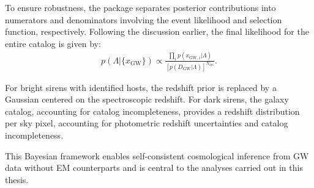 To ensure robustness, the package separates posterior contributions into numerators and denominators involving the event likelihood and selection function, respectively. Following the discussion earlier, the final likelihood for the entire catalog is given by:
\begin{align}
    p(\Lambda | \{x_\mathrm{GW}\}) \propto \frac{\prod_i p(x_{\mathrm{GW},i} | \Lambda)}{[p(D_\mathrm{GW} | \Lambda)]^{N_{\mathrm{det}}}}.
\end{align}

For bright sirens with identified hosts, the redshift prior is replaced by a Gaussian centered on the spectroscopic redshift. For dark sirens, the galaxy catalog, accounting for catalog incompleteness, provides a redshift distribution per sky pixel, accounting for photometric redshift uncertainties and catalog incompleteness.

This Bayesian framework enables self-consistent cosmological inference from \ac{GW} data without \ac{EM} counterparts and is central to the analyses carried out in this thesis.

